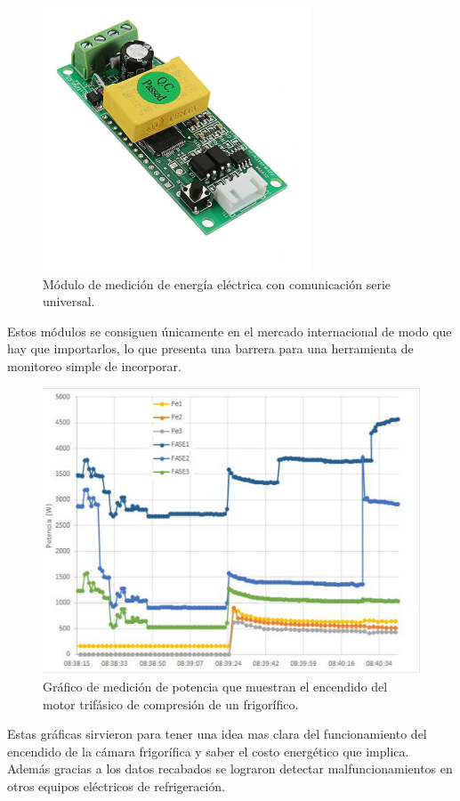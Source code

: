 \begin{figure}[h]
	\centering
	\includegraphics[width=80mm,keepaspectratio]{Figures/pzeem004.jpg}
	\caption{Módulo de medición de energía eléctrica con comunicación serie universal.}
	\label{fig:pzem04}
\end{figure}

Estos módulos se consiguen únicamente en el mercado internacional de modo que hay que importarlos, lo que presenta una barrera para una herramienta de monitoreo simple de incorporar.

\begin{figure}[!htb]
	\centering
	\includegraphics[width=120mm,keepaspectratio]{Figures/potencia_ej.png}
	\caption{Gráfico de medición de potencia que muestran el encendido del motor trifásico de compresión de un frigorífico.}
	\label{fig:graficoW}
\end{figure}

Estas gráficas sirvieron para tener una idea mas clara del funcionamiento del encendido de la cámara frigorífica y saber el costo energético que implica. Además gracias a los datos recabados se lograron detectar malfuncionamientos en otros equipos eléctricos de refrigeración.
 
